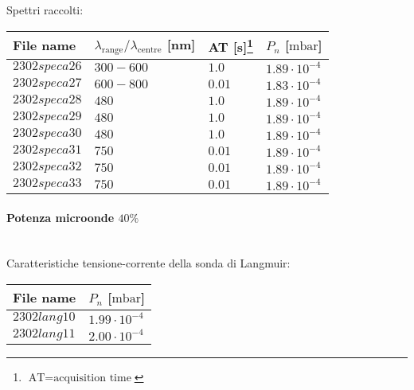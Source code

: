 Spettri raccolti:
\begin{center}
\begin{tabular}{p{3cm}p{4cm}p{2cm}p{3cm}}
\toprule
File name	&$\lambda_\text{range}\text{/}\lambda_\text{centre}$ [nm] &AT [s]\footnote{$\text{AT}=\text{acquisition time}$} &$P_{n}$ [$\si{\milli\bar}$]\\
\midrule
$2302speca26$	&$300-600$	&$1.0$		&$1.89\cdot10^{-4}$\\
$2302speca27$	&$600-800$	&$0.01$		&$1.83\cdot10^{-4}$\\
$2302speca28$	&$480$		&$1.0$		&$1.89\cdot10^{-4}$\\
$2302speca29$	&$480$		&$1.0$		&$1.89\cdot10^{-4}$\\
$2302speca30$	&$480$		&$1.0$		&$1.89\cdot10^{-4}$\\
$2302speca31$	&$750$		&$0.01$		&$1.89\cdot10^{-4}$\\
$2302speca32$	&$750$		&$0.01$		&$1.89\cdot10^{-4}$\\
$2302speca33$	&$750$		&$0.01$		&$1.89\cdot10^{-4}$\\
\bottomrule
\end{tabular}
\end{center}


\paragraph*{Potenza microonde $\text{40\%}$} ~\\
Caratteristiche tensione-corrente della sonda di Langmuir:
\begin{center}
\begin{tabular}{p{3cm}p{3cm}}
\toprule
File name	&$P_{n}$ [$\si{\milli\bar}$]\\
\midrule
$2302lang10$	&$1.99\cdot10^{-4}$\\
$2302lang11$	&$2.00\cdot10^{-4}$\\
\bottomrule
\end{tabular}
\end{center}

